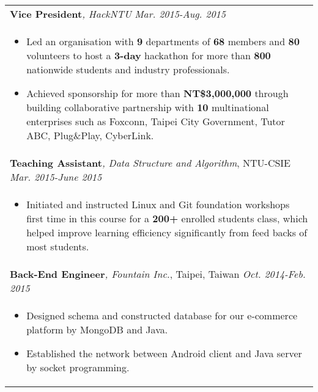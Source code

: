 \documentclass[a4paper,10pt]{article} %
\begin{document}
{\begin{tabular}{p{16cm}}
\normalsize\textbf{Vice President}{\it, HackNTU}  \hfill \it{Mar. 2015-Aug. 2015}\\ %
\begin{itemize}
\vspace{-2mm}
\item Led an organisation with \textbf{9} departments of \textbf{68} members and \textbf{80} volunteers to host a \textbf{3-day} hackathon for more than \textbf{800} nationwide students and industry professionals.
\item Achieved sponsorship for more than \textbf{NT\$3,000,000} through building collaborative partnership with \textbf{10} multinational enterprises such as 
	Foxconn, Taipei City Government, Tutor ABC, Plug\&Play, CyberLink. \vspace*{-\baselineskip}
\end{itemize}\\
\vspace{0.5mm}

\normalsize\textbf{Teaching Assistant}{\it, Data Structure and Algorithm}, NTU-CSIE  \hfill  \it{Mar. 2015-June 2015} \\%
\begin{itemize}
\vspace{-2mm}
\item Initiated and instructed Linux and Git foundation workshops first time in this course for a \textbf{200+} enrolled students class, which helped improve learning efficiency significantly from feed backs of most students.\vspace*{-\baselineskip}
\end{itemize} \\ 
\vspace{0.5mm}

\normalsize\textbf{Back-End Engineer}{\it, Fountain Inc.}, Taipei, Taiwan \hfill  \it{Oct. 2014-Feb. 2015}  \\%
\begin{itemize}
\vspace{-2mm}
\item Designed schema and constructed database for our e-commerce platform by MongoDB and Java. 
\item Established the network between Android client and Java server by socket programming. \vspace*{-\baselineskip}
\end{itemize}\\
\end{tabular}

}
\end{document}
